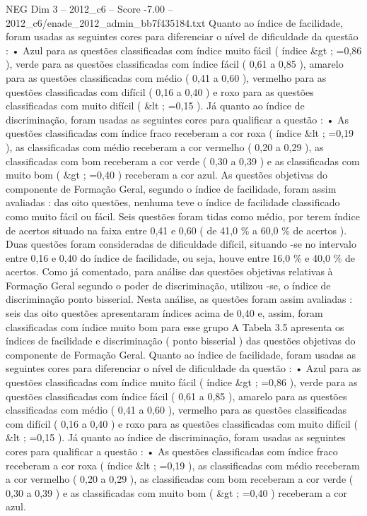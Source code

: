 \begin{textsample}{NEG Dim 3 – 2012\_c6 – Score -7.00 – 2012\_c6/enade\_2012\_admin\_bb7f435184.txt}
Quanto ao índice de facilidade, foram usadas as seguintes cores para diferenciar o nível de dificuldade da questão : • Azul para as questões classificadas com índice muito fácil ( índice \&gt ; =0,86 ), verde para as questões classificadas com índice fácil ( 0,61 a 0,85 ), amarelo para as questões classificadas com médio ( 0,41 a 0,60 ), vermelho para as questões classificadas com difícil ( 0,16 a 0,40 ) e roxo para as questões classificadas com muito difícil ( \&lt ; =0,15 ).
Já quanto ao índice de discriminação, foram usadas as seguintes cores para qualificar a questão : • As questões classificadas com índice fraco receberam a cor roxa ( índice \&lt ; =0,19 ), as classificadas com médio receberam a cor vermelho ( 0,20 a 0,29 ), as classificadas com bom receberam a cor verde ( 0,30 a 0,39 ) e as classificadas com muito bom ( \&gt ; =0,40 ) receberam a cor azul.
As questões objetivas do componente de Formação Geral, segundo o índice de facilidade, foram assim avaliadas : das oito questões, nenhuma teve o índice de facilidade classificado como muito fácil ou fácil.
Seis questões foram tidas como médio, por terem índice de acertos situado na faixa entre 0,41 e 0,60 ( de 41,0 \% a 60,0 \% de acertos ).
Duas questões foram consideradas de dificuldade difícil, situando -se no intervalo entre 0,16 e 0,40 do índice de facilidade, ou seja, houve entre 16,0 \% e 40,0 \% de acertos.
Como já comentado, para análise das questões objetivas relativas à Formação Geral segundo o poder de discriminação, utilizou -se, o índice de discriminação ponto bisserial.
Nesta análise, as questões foram assim avaliadas : seis das oito questões apresentaram índices acima de 0,40 e, assim, foram classificadas com índice muito bom para esse grupo A Tabela 3.5 apresenta os índices de facilidade e discriminação ( ponto bisserial ) das questões objetivas do componente de Formação Geral.
Quanto ao índice de facilidade, foram usadas as seguintes cores para diferenciar o nível de dificuldade da questão : • Azul para as questões classificadas com índice muito fácil ( índice \&gt ; =0,86 ), verde para as questões classificadas com índice fácil ( 0,61 a 0,85 ), amarelo para as questões classificadas com médio ( 0,41 a 0,60 ), vermelho para as questões classificadas com difícil ( 0,16 a 0,40 ) e roxo para as questões classificadas com muito difícil ( \&lt ; =0,15 ).
Já quanto ao índice de discriminação, foram usadas as seguintes cores para qualificar a questão : • As questões classificadas com índice fraco receberam a cor roxa ( índice \&lt ; =0,19 ), as classificadas com médio receberam a cor vermelho ( 0,20 a 0,29 ), as classificadas com bom receberam a cor verde ( 0,30 a 0,39 ) e as classificadas com muito bom ( \&gt ; =0,40 ) receberam a cor azul.

\end{textsample}

